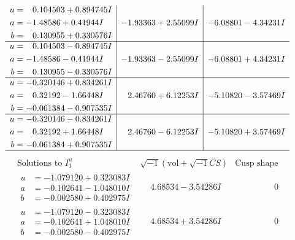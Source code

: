 \documentclass[1p]{elsarticle_modified}
\theoremstyle{definition}
\newcommand{\I}{\sqrt{-1}}
\begin{document}
$$\begin{array}{c|c|c}
\begin{aligned}
u &= \phantom{-}0.104503 + 0.894745 I \\
a &= -1.48586 + 0.41944 I \\
b &= \phantom{-}0.130955 + 0.330576 I\end{aligned}
 & -1.93363 + 2.55099 I & -6.08801 - 4.34231 I \\ \hline\begin{aligned}
u &= \phantom{-}0.104503 - 0.894745 I \\
a &= -1.48586 - 0.41944 I \\
b &= \phantom{-}0.130955 - 0.330576 I\end{aligned}
 & -1.93363 - 2.55099 I & -6.08801 + 4.34231 I \\ \hline\begin{aligned}
u &= -0.320146 + 0.834261 I \\
a &= \phantom{-}0.32192 - 1.66448 I \\
b &= -0.061384 - 0.907535 I\end{aligned}
 & \phantom{-}2.46760 + 6.12253 I & -5.10820 - 3.57469 I \\ \hline\begin{aligned}
u &= -0.320146 - 0.834261 I \\
a &= \phantom{-}0.32192 + 1.66448 I \\
b &= -0.061384 + 0.907535 I\end{aligned}
 & \phantom{-}2.46760 - 6.12253 I & -5.10820 + 3.57469 I\\
 \hline 
 \end{array}$$\newpage$$\begin{array}{c|c|c}  
\text{Solutions to }I^u_{1}& \I (\text{vol} + \sqrt{-1}CS) & \text{Cusp shape}\\
 \hline 
\begin{aligned}
u &= -1.079120 + 0.323083 I \\
a &= -0.102641 - 1.048010 I \\
b &= -0.002580 + 0.402975 I\end{aligned}
 & \phantom{-}4.68534 - 3.54286 I & \phantom{-0.000000 } 0 \\ \hline\begin{aligned}
u &= -1.079120 - 0.323083 I \\
a &= -0.102641 + 1.048010 I \\
b &= -0.002580 - 0.402975 I\end{aligned}
 & \phantom{-}4.68534 + 3.54286 I & \phantom{-0.000000 } 0 \\ \hline\begin{aligned}

\end{aligned}
\end{array}$$
\end{document}
